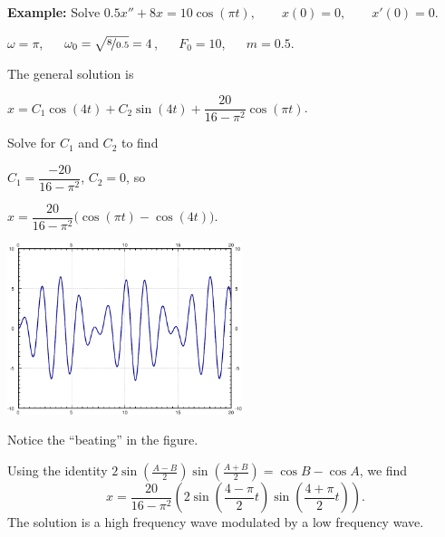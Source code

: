 \documentclass[10pt,aspectratio=169]{beamer}
\begin{document}
\begin{frame}

\textbf{Example:}
Solve \qquad
$0.5 x'' + 8 x = 10 \cos (\pi t), \qquad x(0)=0, \qquad x'(0)=0$.

\medskip
\pause

$\omega = \pi$, ~~ $\omega_0 = \sqrt{\nicefrac{8}{0.5}} = 4$,
~~ $F_0 = 10$, ~~ $m=0.5$.

\medskip
\pause

The general solution is


\quad $x = C_1 \cos (4 t) + C_2 \sin (4 t) +
\dfrac{20}{16 - \pi^2} \cos (\pi t)$.

\pause
\medskip

Solve for $C_1$ and $C_2$ to find

\medskip

\quad $C_1 = \dfrac{-20}{16 - \pi^2}$, \quad $C_2 = 0$, \quad so

\pause
\medskip

\quad $x = 
\dfrac{20}{16 - \pi^2} \bigl( \cos (\pi t)- \cos (4 t) \bigr)$.

\vspace*{-1.7in}
\hfill\includegraphics[width=2.7in]{../figures/3-6-beating.pdf}

\vspace*{-0.2in}
\pause

Notice the ``beating'' in the figure.

\medskip
\pause

Using the
identity
\quad
$
2\sin \left( \frac{A-B}{2} \right) \sin \left( \frac{A+B}{2} \right) =
\cos B -\cos A
$,
\quad 
we find
\[
x = 
\frac{20}{16 - \pi^2} \left( 2 \sin \left(\frac{4-\pi}{2} t \right)
\sin \left( \frac{4+\pi}{2} t \right) \right) .
\]
\pause
The solution is a high frequency wave modulated by a low frequency
wave.
\end{frame}
\end{document}
